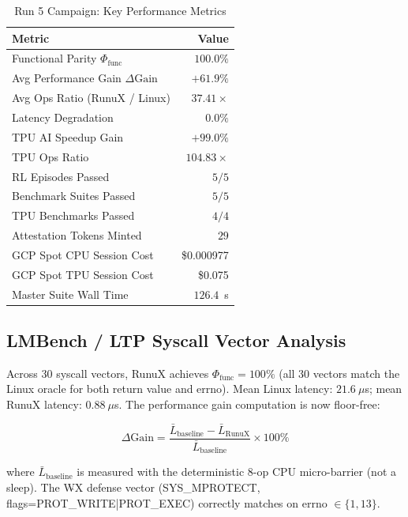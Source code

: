 \documentclass[10pt,twocolumn]{article}
\begin{document}
\begin{table}[ht]
\centering
\caption{Run 5 Campaign: Key Performance Metrics}
\label{tab:metrics}
\small
\begin{tabular}{lr}
\toprule
\textbf{Metric} & \textbf{Value} \\
\midrule
Functional Parity $\Phi_{\text{func}}$ & $100.0\%$ \\
Avg Performance Gain $\Delta\text{Gain}$ & $+61.9\%$ \\
Avg Ops Ratio (RunuX / Linux) & $37.41\times$ \\
Latency Degradation & $0.0\%$ \\
TPU AI Speedup Gain & $+99.0\%$ \\
TPU Ops Ratio & $104.83\times$ \\
RL Episodes Passed & $5/5$ \\
Benchmark Suites Passed & $5/5$ \\
TPU Benchmarks Passed & $4/4$ \\
Attestation Tokens Minted & $29$ \\
GCP Spot CPU Session Cost & \$0.000977 \\
GCP Spot TPU Session Cost & \$0.075 \\
Master Suite Wall Time & $126.4$~s \\
\bottomrule
\end{tabular}
\end{table}

\subsection{LMBench / LTP Syscall Vector Analysis}

Across 30 syscall vectors, RunuX achieves $\Phi_{\text{func}} = 100\%$
(all 30 vectors match the Linux oracle for both return value and errno).
Mean Linux latency: $21.6~\mu$s; mean RunuX latency: $0.88~\mu$s.
The performance gain computation is now floor-free:

\begin{equation}
  \Delta\text{Gain} = \frac{\bar{L}_{\text{baseline}} - \bar{L}_{\text{RunuX}}}
                          {\bar{L}_{\text{baseline}}} \times 100\%
\end{equation}

where $\bar{L}_{\text{baseline}}$ is measured with the deterministic 8-op
CPU micro-barrier (not a sleep). The W$\hat{}$X defense vector (SYS\_MPROTECT,
flags=PROT\_WRITE|PROT\_EXEC) correctly matches on errno $\in \{1, 13\}$.
\end{document}
